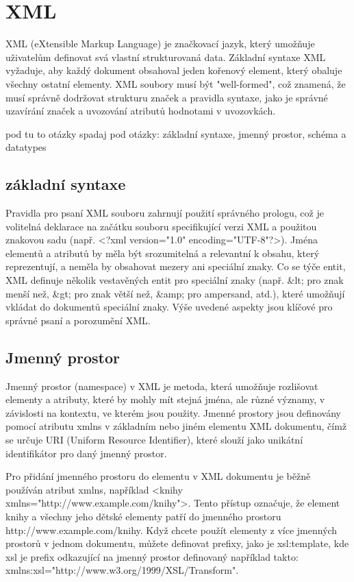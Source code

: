 \chapter{XML}
\label{cha:XML}

XML (eXtensible Markup Language) je značkovací jazyk, který umožňuje uživatelům definovat svá vlastní strukturovaná data. Základní syntaxe XML vyžaduje, aby každý dokument obsahoval jeden kořenový element, který obaluje všechny ostatní elementy. XML soubory musí být "well-formed", což znamená, že musí správně dodržovat strukturu značek a pravidla syntaxe, jako je správné uzavírání značek a uvozování atributů hodnotami v uvozovkách.

pod tu to otázky spadaj pod otázky: základní syntaxe, jmenný prostor, schéma a datatypes

\section{základní syntaxe}
\label{sec:xml_syntaxe}
Pravidla pro psaní XML souboru zahrnují použití správného prologu, což je volitelná deklarace na začátku souboru specifikující verzi XML a použitou znakovou sadu (např. <?xml version="1.0" encoding="UTF-8"?>). Jména elementů a atributů by měla být srozumitelná a relevantní k obsahu, který reprezentují, a neměla by obsahovat mezery ani speciální znaky. Co se týče entit, XML definuje několik vestavěných entit pro speciální znaky (např. \&lt; pro znak menší než, \&gt; pro znak větší než, \&amp; pro ampersand, atd.), které umožňují vkládat do dokumentů speciální znaky. Výše uvedené aspekty jsou klíčové pro správné psaní a porozumění XML.

\section{Jmenný prostor}
\label{sec:xml_prostor}
Jmenný prostor (namespace) v XML je metoda, která umožňuje rozlišovat elementy a atributy, které by mohly mít stejná jména, ale různé významy, v závislosti na kontextu, ve kterém jsou použity. Jmenné prostory jsou definovány pomocí atributu xmlns v základním nebo jiném elementu XML dokumentu, čímž se určuje URI (Uniform Resource Identifier), které slouží jako unikátní identifikátor pro daný jmenný prostor.

Pro přidání jmenného prostoru do elementu v XML dokumentu je běžně používán atribut xmlns, například <knihy xmlns="http://www.example.com/knihy">. Tento přístup označuje, že element knihy a všechny jeho dětské elementy patří do jmenného prostoru http://www.example.com/knihy. Když chcete použít elementy z více jmenných prostorů v jednom dokumentu, můžete definovat prefixy, jako je xsl:template, kde xsl je prefix odkazující na jmenný prostor definovaný například takto: xmlns:xsl="http://www.w3.org/1999/XSL/Transform".

